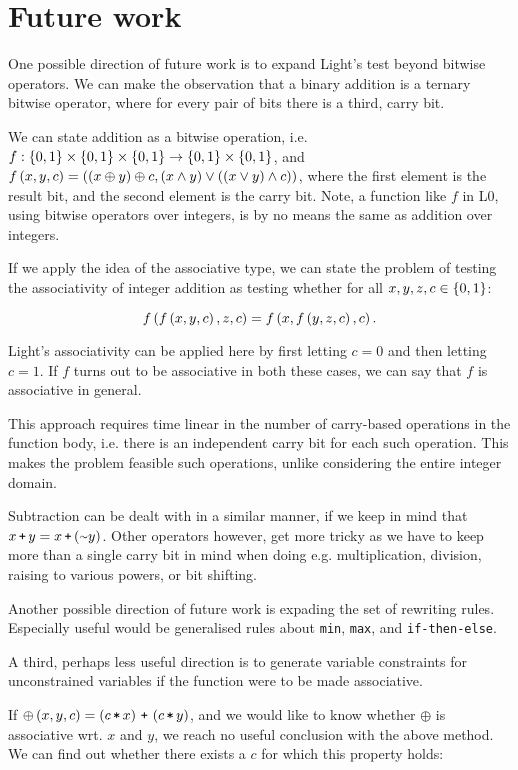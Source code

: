 \section{Future work}

One possible direction of future work is to expand Light's test beyond bitwise
operators. We can make the observation that a binary addition is a ternary
bitwise operator, where for every pair of bits there is a third, carry bit.

We can state addition as a bitwise operation, i.e. $f : \left\{{0,1}\right\} \times
\left\{{0,1}\right\} \times \left\{{0,1}\right\} \rightarrow \left\{{0,1}\right\} \times \left\{{0,1}\right\}$, and
$f\left({x,y,c}\right)=\left({\left({x \oplus y}\right) \oplus c, \left({x \wedge y}\right) \vee \left({ \left({ x \vee y}\right)
\wedge c}\right)}\right)$, where the first element is the result bit, and the second element
is the carry bit. Note, a function like $f$ in L0, using bitwise operators over
integers, is by no means the same as addition over integers.

If we apply the idea of the associative type, we can state the problem of
testing the associativity of integer addition as testing whether for all
$x,y,z,c\in \left\{{0,1}\right\}$:

\[f\left({f\left({x,y,c}\right), z,c}\right) = f\left({x, f\left({y,z,c}\right),c}\right).\]

Light's associativity can be applied here by first letting $c=0$ and then
letting $c=1$. If $f$ turns out to be associative in both these cases, we can
say that $f$ is associative in general.

This approach requires time linear in the number of carry-based operations in
the function body, i.e. there is an independent carry bit for each such
operation. This makes the problem feasible such operations, unlike considering
the entire integer domain.

Subtraction can be dealt with in a similar manner, if we keep in mind that
$x\lp y=x \lp(\lneg y)$. Other operators however, get more tricky as we have to
keep more than a single carry bit in mind when doing e.g. multiplication,
division, raising to various powers, or bit shifting.

Another possible direction of future work is expading the set of rewriting
rules. Especially useful would be generalised rules about \texttt{min},
\texttt{max}, and \texttt{if-then-else}.

A third, perhaps less useful direction is to generate variable constraints for
unconstrained variables if the function were to be made associative.

If $\oplus\p{x,y,c} = \p{c\lt x} \lp \p{c \lt y}$, and we would like to know
whether $\oplus$ is associative wrt. $x$ and $y$, we reach no useful conclusion
with the above method. We can find out whether there exists a $c$ for which
this property holds:

